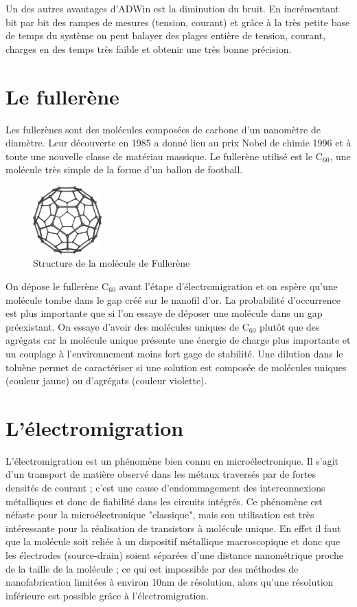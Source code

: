 Un des autres avantages d'ADWin est la diminution du bruit. En incrémentant bit par bit des rampes de mesures (tension, courant) et grâce à la très petite base de temps du système on peut balayer des plages entière de tension, courant, charges en des temps très faible et obtenir une très bonne précision.

\section{Le fullerène}
Les fullerènes sont des molécules composées de carbone d'un nanomètre de diamètre. Leur découverte en 1985 a donné lieu au prix Nobel de chimie 1996 et à toute une nouvelle classe de matériau massique. Le fullerène utilisé est le C$_{60}$, une molécule très simple de la forme d'un ballon de football.

\begin{figure}[h]
    \begin{center}
        \includegraphics[width=100px]{Images/C60.png}
        \caption{Structure de la molécule de Fullerène}
        \label{fig:}
    \end{center}
\end{figure}

On dépose le fullerène C$_{60}$ avant l'étape d'électromigration et on espère qu'une molécule tombe dans le gap créé sur le nanofil d'or. La probabilité d'occurrence est plus importante que si l'on essaye de déposer une molécule dans un gap préexistant. On essaye d'avoir des molécules uniques de C$_{60}$ plutôt que des agrégats car la molécule unique présente une énergie de charge plus importante et un couplage à l'environnement moins fort gage de stabilité. Une dilution dans le toluène permet de caractériser si une solution est composée de molécules uniques (couleur jaune) ou d'agrégats (couleur violette).


\section{L'électromigration}
L'électromigration est un phénomène bien connu en microélectronique. Il s'agit d'un transport de matière observé dans les métaux traversés par de fortes densités de courant ; c'est une cause d'endommagement des interconnexions métalliques et donc de fiabilité dans les circuits intégrés\cite{8}. Ce phénomène est néfaste pour la microélectronique "classique", mais son utilisation est très intéressante pour la réalisation de transistors à molécule unique. En effet il faut que la molécule soit reliée à un dispositif métallique macroscopique et donc que les électrodes (source-drain) soient séparées d'une distance nanométrique proche de la taille de la molécule ; ce qui est impossible par des méthodes de nanofabrication limitées à environ 10nm de résolution, alors qu'une résolution inférieure est possible grâce à l'électromigration\cite{9}.\\

